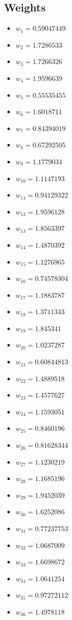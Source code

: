 \documentclass[11pt]{article}
\begin{document}
\subsection*{Weights}
\begin{itemize}
\item $w_{1} = 0.59047449$
\item $w_{2} = 1.7286533$
\item $w_{3} = 1.7266326$
\item $w_{4} = 1.9596639$
\item $w_{5} = 0.55535455$
\item $w_{6} = 1.6018711$
\item $w_{7} = 0.84394019$
\item $w_{8} = 0.67292505$
\item $w_{9} = 1.1779034$
\item $w_{10} = 1.1147193$
\item $w_{11} = 0.94129322$
\item $w_{12} = 1.9596128$
\item $w_{13} = 1.8563397$
\item $w_{14} = 1.4870392$
\item $w_{15} = 1.1276965$
\item $w_{16} = 0.74578304$
\item $w_{17} = 1.1883787$
\item $w_{18} = 1.3711343$
\item $w_{19} = 1.845341$
\item $w_{20} = 1.0237287$
\item $w_{21} = 0.60844813$
\item $w_{22} = 1.4889518$
\item $w_{23} = 1.4577627$
\item $w_{24} = 1.1593051$
\item $w_{25} = 0.8460196$
\item $w_{26} = 0.81628344$
\item $w_{27} = 1.1230219$
\item $w_{28} = 1.1685196$
\item $w_{29} = 1.9452039$
\item $w_{30} = 1.6252086$
\item $w_{31} = 0.77237753$
\item $w_{32} = 1.0687009$
\item $w_{33} = 1.6698672$
\item $w_{34} = 1.0641254$
\item $w_{35} = 0.97272112$
\item $w_{36} = 1.4978118$

\end{itemize}
\end{document}
